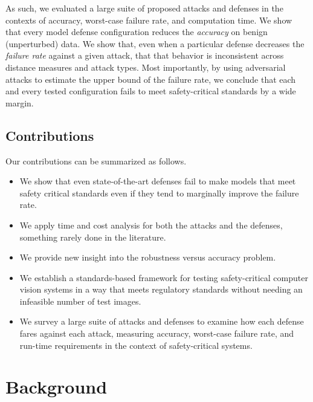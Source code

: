 \documentclass[lettersize,journal]{IEEEtran}
\begin{document}
As such, we evaluated a large suite of proposed attacks and defenses in the contexts of accuracy, worst-case failure rate, and computation time. We show that every model defense configuration reduces the \textit{accuracy} on benign (unperturbed) data. We show that, even when a particular defense decreases the \textit{failure rate} against a given attack, that that behavior is inconsistent across distance measures and attack types. Most importantly, by using adversarial attacks to estimate the upper bound of the failure rate, we conclude that each and every tested configuration fails to meet safety-critical standards by a wide margin.

\subsection{Contributions}
Our contributions can be summarized as follows.

\begin{itemize}
    \item We show that even state-of-the-art defenses fail to make models that meet safety critical standards even if they tend to marginally improve the failure rate.
    \item We apply time and cost analysis for both the attacks and the defenses, something rarely done in the literature.
    \item We provide new insight into the robustness versus accuracy problem.
    \item We establish a standards-based framework for testing safety-critical computer vision systems in a way that meets regulatory standards without needing an infeasible number of test images.
    \item We survey a large suite of attacks and defenses to examine how each defense fares against each attack, measuring accuracy, worst-case failure rate, and run-time requirements in the context of safety-critical systems.
\end{itemize}


\section{Background}
\end{document}
